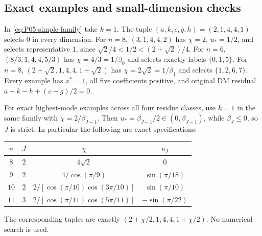 \subsection{Exact examples and small-dimension checks}

In \eqref{eq:P05-simple-family} take $k=1$. The tuple
$(a,k,c,g,h)=(2,1,4,4,1)$ selects $0$ in every dimension.
For $n=8$, $(3,1,4,4,2)$ has $\chi=2$, $u_*=1/2$, and selects
representative $1$, since
$\sqrt2/4<1/2<(2+\sqrt2)/4$.
For $n=6$, $(8/3,1,4,4,5/3)$ has $\chi=4/3=1/\beta_0$ and
selects exactly labels $\{0,1,5\}$.
For $n=8$, $(2+\sqrt2,1,4,4,1+\sqrt2)$ has
$\chi=2\sqrt2=1/\beta_1$ and selects $\{1,2,6,7\}$.
Every example has $x^*=1$, all five coefficients positive, and original
DM residual $a-k-h+(c-g)/2=0$.

For exact highest-mode examples across all four residue classes, use
$k=1$ in the same family with $\chi=2/\beta_{J-1}$. Then
$u_*=\beta_{J-1}/2\in(0,\beta_{J-1})$, while $\beta_J\le0$,
so $J$ is strict. In particular the following are exact specifications:
\begin{center}
\begin{tabular}{@{}c c c c@{}}
\toprule
$n$ & $J$ & $\chi$ & $u_J$\\\midrule
$8$ & $2$ & $4\sqrt2$ & $0$\\
$9$ & $2$ & $4/\cos(\pi/9)$ & $\sin(\pi/18)$\\
$10$ & $2$ & $2/[\cos(\pi/10)\cos(3\pi/10)]$ & $\sin(\pi/10)$\\
$11$ & $3$ & $2/[\cos(\pi/11)\cos(5\pi/11)]$ & $-\sin(\pi/22)$\\
\bottomrule
\end{tabular}
\end{center}
The corresponding tuples are exactly
$(2+\chi/2,1,4,4,1+\chi/2)$. No numerical search is used.

